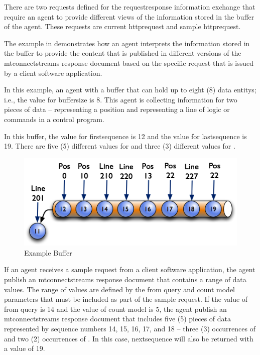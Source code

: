 There are two \glspl{request} defined for the \gls{requestresponse} information exchange that require an \gls{agent} to provide different views of the information stored in the \gls{buffer} of the \gls{agent}.  These \glspl{request} are \gls{current httprequest} and \gls{sample httprequest}.

The example in  demonstrates how an \gls{agent} interprets the information stored in the \gls{buffer} to provide the content that is published in different versions of the \gls{mtconnectstreams response document} based on the specific \gls{request} that is issued by a client software application.

In this example, an \gls{agent} with a \gls{buffer} that can hold up to eight (8) \glspl{data entity}; i.e., the value for \gls{buffersize} is 8.  This \gls{agent} is collecting information for two pieces of data --  representing a position and  representing a line of logic or commands in a control program.  

In this \gls{buffer}, the value for \gls{firstsequence} is 12 and the value for \gls{lastsequence} is 19.  There are five (5) different values for  and three (3) different values for .  

\begin{figure}[ht]
  \centering
  \includegraphics[width=1.0\textwidth]{figures/example-buffer.png}
  \caption{Example Buffer}
  \label{fig:example-buffer}
\end{figure}

\FloatBarrier

If an \gls{agent} receives a \gls{sample request} from a client software application, the \gls{agent} \MUST publish an \gls{mtconnectstreams response document} that contains a range of data values.  The range of values are defined by the \gls{from query} and \gls{count model} parameters that must be included as part of the \gls{sample request}.  If the value of \gls{from query} is 14 and the value of \gls{count model} is 5, the \gls{agent} \MUST publish an \gls{mtconnectstreams response document} that includes five (5) pieces of data represented by \glspl{sequence number} 14, 15, 16, 17, and 18 -- three (3) occurrences of  and two (2) occurrences of .  In this case, \gls{nextsequence} will also be returned with a value of 19.


